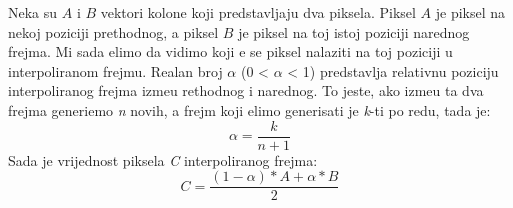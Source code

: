 Neka su $A$ i $B$ vektori kolone koji predstavljaju dva piksela. Piksel $A$ je piksel na nekoj poziciji prethodnog, a piksel $B$ je piksel na toj istoj
poziciji narednog frejma. Mi sada \zh elimo da vidimo koji \cj e se piksel nalaziti na toj poziciji u interpoliranom frejmu. Realan broj $\alpha$ (0 < $\alpha$ < 1) predstavlja relativnu poziciju interpoliranog frejma izme\dj u
rethodnog i narednog. To jeste, ako izme\dj u ta dva frejma generi\sh emo \textit{n} novih, a frejm koji \zh elimo generisati je \textit{k}-ti po redu, tada je:
$$
\alpha=\frac{k}{n+1}
$$
Sada je vrijednost piksela \textit{C} interpoliranog frejma:
$$
C=\frac{(1-\alpha)*A+\alpha*B}{2}
$$